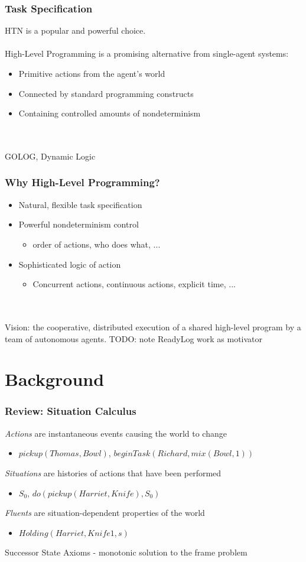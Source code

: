 \documentclass[compress]{beamer}
\begin{document}
\begin{frame}
\frametitle{Task Specification}
HTN is a popular and powerful choice.
\ \\
\ \\
High-Level Programming is a promising alternative from single-agent systems:
\begin{itemize}
\item Primitive actions from the agent's world
\item Connected by standard programming constructs
\item Containing controlled amounts of nondeterminism
\end{itemize}
\ \\
\ \\
GOLOG, Dynamic Logic
\end{frame}

\begin{frame}
\frametitle{Why High-Level Programming?}
\begin{itemize}
\item Natural, flexible task specification
\item Powerful nondeterminism control
  \begin{itemize}
  \item order of actions, who does what, ...
  \end{itemize}
\item Sophisticated logic of action
  \begin{itemize}
  \item Concurrent actions, continuous actions, explicit time, ...
  \end{itemize}
\end{itemize}
\ \\
\ \\
Vision: the cooperative, distributed execution of a shared high-level program by a team of autonomous agents.
TODO: note ReadyLog work as motivator
\end{frame}


\section{Background}

\begin{frame}
\frametitle{Review: Situation Calculus}
\emph{Actions} are instantaneous events causing the world to change
\begin{itemize}
  \item $pickup(Thomas,Bowl)$, $beginTask(Richard,mix(Bowl,1))$
\end{itemize}
\emph{Situations} are histories of actions that have been performed
\begin{itemize}
  \item $S_0$, $do(pickup(Harriet,Knife),S_0)$
\end{itemize}
\emph{Fluents} are situation-dependent properties of the world
\begin{itemize}
  \item $Holding(Harriet,Knife1,s)$
\end{itemize}
Successor State Axioms - monotonic solution to the frame problem
\end{frame}
\end{document}
